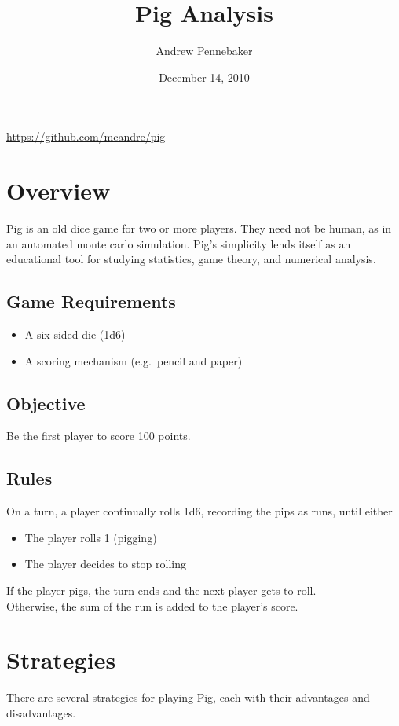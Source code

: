 \documentclass{article}
\title{Pig Analysis}
\author{Andrew Pennebaker}
\date{December 14, 2010}
\begin{document}
\maketitle
\begin{center}
\url{https://github.com/mcandre/pig}
\end{center}

\section*{Overview}
Pig is an old dice game for two or more players. They need not be human, as in an automated monte carlo simulation. Pig's simplicity lends itself as an educational tool for studying statistics, game theory, and numerical analysis.

\subsection*{Game Requirements}
\begin{itemize}
\item A six-sided die (1d6)
\item A scoring mechanism (e.g.\ pencil and paper)
\end{itemize}

\subsection*{Objective}
Be the first player to score 100 points.

\subsection*{Rules}
On a turn, a player continually rolls 1d6, recording the pips as runs, until either
\begin{itemize}
\item The player rolls 1 (pigging)
\item The player decides to stop rolling
\end{itemize}
If the player pigs, the turn ends and the next player gets to roll.\\
Otherwise, the sum of the run is added to the player's score.

\section*{Strategies}
There are several strategies for playing Pig, each with their advantages and disadvantages.
\end{document}
